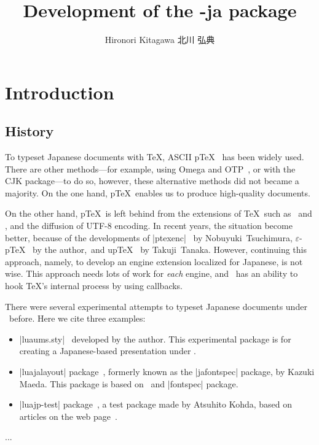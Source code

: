 \documentclass{ajt}
\title{Development of the \LuaTeX-ja package}
\author{Hironori Kitagawa {\normalsize 北川 弘典}}
\begin{document}
\maketitle

\section{Introduction}
\subsection{History}
To typeset Japanese documents with \TeX, ASCII p\TeX~\cite{ptex} has
been widely used.  There are other methods---for example, using Omega
and OTP~\cite{omega}, or with the CJK package---to do so, however,
these alternative methods did not became a majority. On the one hand,
p\TeX\ enables us to produce high-quality documents. 

On the other hand, p\TeX\ is left behind from the extensions of \TeX\
such as \eTeX\ and \pdfTeX, and the diffusion of UTF-8 encoding.  In
recent years, the situation become better, because of the developments
of |ptexenc|~\cite{ptexenc} by Nobuyuki~Tsuchimura,
$\varepsilon$-p\TeX~\cite{eptex} by the author,~and up\TeX~\cite{uptex}
by Takuji~Tanaka. However, continuing this approach, namely, to develop
an engine extension localized for Japanese, is not wise. This approach
needs lots of work for \emph{each} engine, and \LuaTeX\ has an ability
to hook \TeX's internal process by using callbacks.


There were several experimental attempts to typeset
Japanese documents under \LuaTeX\ before. Here we cite three examples:
\begin{itemize}
\item |luaums.sty|~\cite{luaums} developed by the author. This
      experimental package is for creating a Japanese-based presentation
      under \LuaTeX.
\item |luajalayout| package~\cite{luajalayout}, formerly known as the
      |jafontspec| package, by Kazuki Maeda. This package is based on
      \LaTeXe\ and |fontspec| package.
\item |luajp-test| package~\cite{luajp-test}, a test package made by
      Atsuhito Kohda, based on articles on the web page~\cite{joylua}.
\end{itemize}
...
\end{document}
